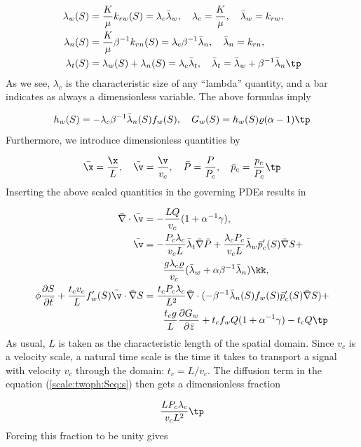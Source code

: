 \documentclass[graybox,envcountchap,sectrefs,final]{svmonodo}
\begin{document}
\begin{align*}
\lambda_w(S) &= \frac{K}{\mu}k_{rw}(S) = \lambda_c\bar\lambda_w,\quad
\lambda_c=\frac{K}{\mu},\quad \bar\lambda_w = k_{rw},\\ 
\lambda_n(S) &= \frac{K}{\mu}\beta^{-1}k_{rn}(S) = \lambda_c\beta^{-1}\bar\lambda_n,
\quad\bar\lambda_n = k_{rn},\\ 
\lambda_t(S) &= \lambda_w(S) + \lambda_n(S) = \lambda_c\bar\lambda_t,\quad
\bar\lambda_t = \bar \lambda_w +
\beta^{-1}\bar\lambda_n\tp
\end{align*}
As we see, $\lambda_c$ is the characteristic size of any ``lambda''
quantity, and a bar indicates as always a dimensionless variable.
The above formulas imply

\[ h_w(S) = -\lambda_c\beta^{-1}\bar\lambda_n(S)f_w(S),\quad
G_w(S) = h_w(S)\varrho(\alpha - 1)\tp\]
Furthermore, we introduce dimensionless quantities by

\[ \bar\x = \frac{\x}{L},\quad \bar\v = \frac{\v}{v_c},\quad
\bar P = \frac{P}{P_c},\quad\bar p_c = \frac{p_c}{P_c}\tp\]
Inserting the above scaled quantities in the governing PDEs results in

\begin{align}
\bar\nabla\cdot\bar\v &= -\frac{LQ}{v_c}(1 + \alpha^{-1}\gamma),
\label{scale:twoph:Peq:s0}\\ 
\bar\v &= -\frac{P_c\lambda_c}{v_c L}\bar\lambda_t\bar\nabla\bar P +
\frac{\lambda_c P_c}{v_c L}\bar\lambda_w \bar p_c'(S)\bar\nabla S +\nonumber\\ 
&\quad\quad\frac{g\lambda_c\varrho}{v_c}
(\bar\lambda_w + \alpha\beta^{-1}\bar\lambda_n)\kk,
\label{scale:twoph:v_teq:s0}\\ 
\phi\frac{\partial S}{\partial\bar t} + \frac{t_cv_c}{L}f_w'(S)\bar\v\cdot
\bar\nabla S &=
\frac{t_c P_c\lambda_c}{L^2}
\bar\nabla\cdot(-\beta^{-1}\bar\lambda_n(S)f_w(S)\bar p_c'(S)\bar\nabla S) + \nonumber\\ 
&\quad\quad \frac{t_c g}{L}\frac{\partial G_w}{\partial\bar z} + t_c f_w Q(1+\alpha^{-1}\gamma) - t_cQ\tp
\label{scale:twoph:Seq:s0}
\end{align}
As usual, $L$ is taken as the characteristic length of the spatial domain.
Since $v_c$ is a velocity scale, a natural time scale is the time it
takes to transport a signal with velocity $v_c$ through the domain:
$t_c = L/v_c$. The diffusion term in the equation
(\ref{scale:twoph:Seq:s}) then gets
a dimensionless fraction

\[ \frac{L P_c\lambda_c}{v_c L^2}\tp\]
Forcing this fraction to be unity gives
\end{document}
